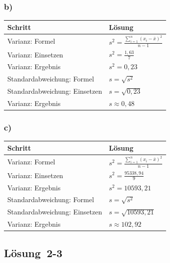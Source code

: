 \documentclass[
  11pt,
  ngerman,
  a4paper,
]{report}
\begin{document}
\hypertarget{b-3}{%
\subsubsection{b)}\label{b-3}}

\begin{table}[H]
\centering
\begin{tabular}{ll}
\toprule
\textbf{Schritt} & \textbf{Lösung}\\
\midrule
Varianz: Formel & $s^2=\frac{\sum\limits_{i=1}^{n}(x_{i}-\bar{x})^2}{n-1}$\\
Varianz: Einsetzen & $s^2=\frac{1{,}63}{7}$\\
Varianz: Ergebnis & $s^2=0{,}23$\\
Standardabweichung: Formel & $s=\sqrt{s^2}$\\
Standardabweichung: Einsetzen & $s=\sqrt{0{,}23}$\\
Varianz: Ergebnis & $s\approx0{,}48$\\
\bottomrule
\end{tabular}
\end{table}

\hypertarget{c-3}{%
\subsubsection{c)}\label{c-3}}

\begin{table}[H]
\centering
\begin{tabular}{ll}
\toprule
\textbf{Schritt} & \textbf{Lösung}\\
\midrule
Varianz: Formel & $s^2=\frac{\sum\limits_{i=1}^{n}(x_{i}-\bar{x})^2}{n-1}$\\
Varianz: Einsetzen & $s^2=\frac{95338{,}94}{9}$\\
Varianz: Ergebnis & $s^2=10593{,}21$\\
Standardabweichung: Formel & $s=\sqrt{s^2}$\\
Standardabweichung: Einsetzen & $s=\sqrt{10593{,}21}$\\
Varianz: Ergebnis & $s\approx102{,}92$\\
\bottomrule
\end{tabular}
\end{table}

\hypertarget{loesung-2-3}{%
\subsection{Lösung~2-3}\label{loesung-2-3}}
\end{document}
